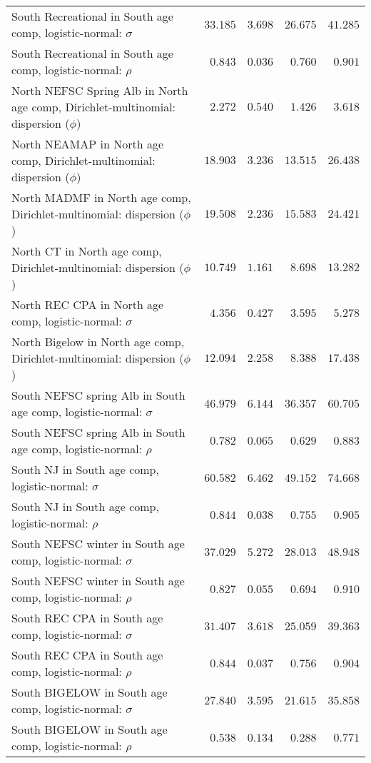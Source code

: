 \documentclass[
]{article}
\begin{document}
\begin{landscape}
\begin{longtable}[t]{lrrrr}
South Recreational in South age comp, logistic-normal: $\sigma$ & $33.185$ & $3.698$ & $26.675$ & $41.285$\\
South Recreational in South age comp, logistic-normal: $\rho$ & $0.843$ & $0.036$ & $0.760$ & $0.901$\\
\addlinespace
North NEFSC Spring Alb in North age comp, Dirichlet-multinomial: dispersion ($\phi$) & $2.272$ & $0.540$ & $1.426$ & $3.618$\\
North NEAMAP in North age comp, Dirichlet-multinomial: dispersion ($\phi$) & $18.903$ & $3.236$ & $13.515$ & $26.438$\\
North MADMF in North age comp, Dirichlet-multinomial: dispersion ($\phi$) & $19.508$ & $2.236$ & $15.583$ & $24.421$\\
North CT in North age comp, Dirichlet-multinomial: dispersion ($\phi$) & $10.749$ & $1.161$ & $8.698$ & $13.282$\\
North REC CPA in North age comp, logistic-normal: $\sigma$ & $4.356$ & $0.427$ & $3.595$ & $5.278$\\
\addlinespace
North Bigelow in North age comp, Dirichlet-multinomial: dispersion ($\phi$) & $12.094$ & $2.258$ & $8.388$ & $17.438$\\
South NEFSC spring Alb in South age comp, logistic-normal: $\sigma$ & $46.979$ & $6.144$ & $36.357$ & $60.705$\\
South NEFSC spring Alb in South age comp, logistic-normal: $\rho$ & $0.782$ & $0.065$ & $0.629$ & $0.883$\\
South NJ in South age comp, logistic-normal: $\sigma$ & $60.582$ & $6.462$ & $49.152$ & $74.668$\\
South NJ in South age comp, logistic-normal: $\rho$ & $0.844$ & $0.038$ & $0.755$ & $0.905$\\
\addlinespace
South NEFSC winter in South age comp, logistic-normal: $\sigma$ & $37.029$ & $5.272$ & $28.013$ & $48.948$\\
South NEFSC winter in South age comp, logistic-normal: $\rho$ & $0.827$ & $0.055$ & $0.694$ & $0.910$\\
South REC CPA in South age comp, logistic-normal: $\sigma$ & $31.407$ & $3.618$ & $25.059$ & $39.363$\\
South REC CPA in South age comp, logistic-normal: $\rho$ & $0.844$ & $0.037$ & $0.756$ & $0.904$\\
South BIGELOW in South age comp, logistic-normal: $\sigma$ & $27.840$ & $3.595$ & $21.615$ & $35.858$\\
\addlinespace
South BIGELOW in South age comp, logistic-normal: $\rho$ & $0.538$ & $0.134$ & $0.288$ & $0.771$\\

\end{longtable}
\end{landscape}
\end{document}
